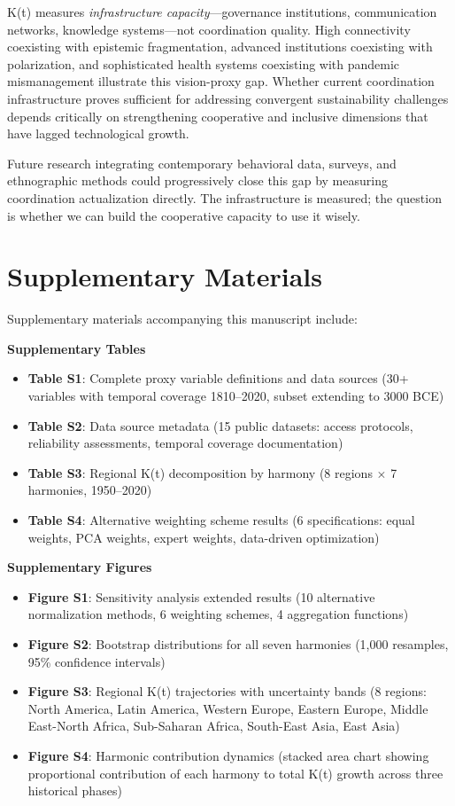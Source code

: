\documentclass[11pt,letterpaper]{article}
\begin{document}
K(t) measures \textit{infrastructure capacity}---governance institutions, communication networks, knowledge systems---not coordination quality. High connectivity coexisting with epistemic fragmentation, advanced institutions coexisting with polarization, and sophisticated health systems coexisting with pandemic mismanagement illustrate this vision-proxy gap. Whether current coordination infrastructure proves sufficient for addressing convergent sustainability challenges depends critically on strengthening cooperative and inclusive dimensions that have lagged technological growth.

Future research integrating contemporary behavioral data, surveys, and ethnographic methods could progressively close this gap by measuring coordination actualization directly. The infrastructure is measured; the question is whether we can build the cooperative capacity to use it wisely.

\section*{Supplementary Materials}

Supplementary materials accompanying this manuscript include:

\textbf{Supplementary Tables}
\begin{itemize}
\item \textbf{Table S1}: Complete proxy variable definitions and data sources (30+ variables with temporal coverage 1810--2020, subset extending to 3000 BCE)
\item \textbf{Table S2}: Data source metadata (15 public datasets: access protocols, reliability assessments, temporal coverage documentation)
\item \textbf{Table S3}: Regional K(t) decomposition by harmony (8 regions $\times$ 7 harmonies, 1950--2020)
\item \textbf{Table S4}: Alternative weighting scheme results (6 specifications: equal weights, PCA weights, expert weights, data-driven optimization)
\end{itemize}

\textbf{Supplementary Figures}
\begin{itemize}
\item \textbf{Figure S1}: Sensitivity analysis extended results (10 alternative normalization methods, 6 weighting schemes, 4 aggregation functions)
\item \textbf{Figure S2}: Bootstrap distributions for all seven harmonies (1,000 resamples, 95\% confidence intervals)
\item \textbf{Figure S3}: Regional K(t) trajectories with uncertainty bands (8 regions: North America, Latin America, Western Europe, Eastern Europe, Middle East-North Africa, Sub-Saharan Africa, South-East Asia, East Asia)
\item \textbf{Figure S4}: Harmonic contribution dynamics (stacked area chart showing proportional contribution of each harmony to total K(t) growth across three historical phases)
\end{itemize}
\end{document}
